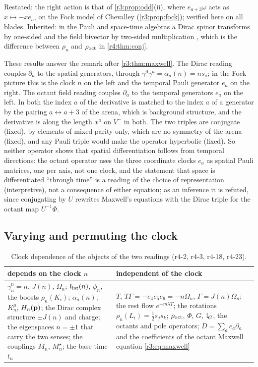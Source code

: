 Restated: the right action is that of \cref{r3:prop:odd}(ii), where $e_{a+3}\omega$ acts as $x\mapsto-xe_a$, on the Fock model of Chevalley
\cite{Chevalley54} (\cref{r3:prop:fock}); verified here on all blades. Inherited: in the Pauli and space-time algebras a Dirac spinor transforms
by one-sided and the field bivector by two-sided multiplication \cite{Hestenes66,Hestenes67}, which is the difference between $\rho_n$ and $\rho_{\rm oct}$
in \cref{r4:thm:conj}.

These results answer the remark after \cref{r3:thm:maxwell}. The Dirac reading couples $\partial_a$ to the spatial generators, through $\gamma^0\gamma^a=\alpha_a(n)=ns_a$;
in the Fock picture this is the clock $n$ on the left and the temporal Pauli generator $e_a$ on the right. The octant field reading couples $\partial_a$ to
the temporal generators $e_a$ on the left. In both the index $a$ of the derivative is matched to the index $a$ of a generator by the pairing
$a\leftrightarrow a+3$ of the arena, which is background structure, and the derivative is along the length $x^a$ on $V^-$ in both. The two triples are
conjugate (fixed), by elements of mixed parity only, which are no symmetry of the arena (fixed), and any Pauli triple would make the operator
hyperbolic (fixed). So neither operator shows that spatial differentiation follows from temporal directions: the octant operator uses the three
coordinate clocks $e_a$ as spatial Pauli matrices, one per axis, not one clock, and the statement that space is differentiated ``through time'' is a
reading of the choice of representation (interpretive), not a consequence of either equation; as an inference it is refuted, since conjugating by $U$
rewrites Maxwell's equations with the Dirac triple for the octant map $U^{-1}\Phi$.

\subsection{Varying and permuting the clock}
\label{r4:sec:clock}

\begin{table}[t]
\centering
\footnotesize
\renewcommand{\arraystretch}{1.15}
\begin{tabular}{@{}>{\raggedright\arraybackslash}p{7.3cm}>{\raggedright\arraybackslash}p{7.3cm}@{}}
\toprule
depends on the clock $n$ & independent of the clock\\
\midrule
$\gamma^0_n=n$, $J(n)$, $\Omega_n$; $\mathfrak l_{\rm int}(n)$, $\phi_n$, the boosts $\rho_n(K_i)$; $\alpha_a(n)$; $K^\mu_n$, $H_n(\mathbf p)$; the Dirac complex structure $\pm J(n)$ and charge;
the eigenspaces $n=\pm1$ that carry the two senses; the couplings $M_n$, $M^\star_n$; the base time $t_n$ &
$T$, $T\Gamma=-e_4e_5e_6=-n\Omega_n$, $\Gamma=J(n)\Omega_n$; the rest flow $e^{-m\lambda T}$; the rotations $\rho_n(L_i)=\tfrac12s_js_k$; $\rho_{\rm oct}$, $\Phi$, $G$, $\mathfrak l_G$, the octants and
pole operators; $D=\sum_ae_a\partial_a$ and the coefficients of the octant Maxwell equation \cref{r3:eq:maxwell}\\
\bottomrule
\end{tabular}
\caption{Clock dependence of the objects of the two readings (r4-2, r4-3, r4-18, r4-23).}
\label{r4:tab:clock}
\end{table}


